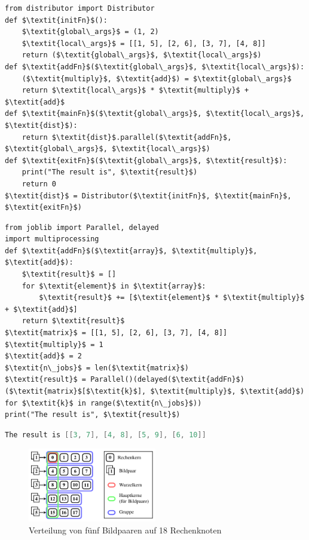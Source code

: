 \begin{lstlisting}[caption={Parallelisierung mittels der in \gls{MPI} implementierten Version},label={lst:dist_api}]
from distributor import Distributor
def $\textit{initFn}$():
	$\textit{global\_args}$ = (1, 2)
	$\textit{local\_args}$ = [[1, 5], [2, 6], [3, 7], [4, 8]]
	return ($\textit{global\_args}$, $\textit{local\_args}$)
def $\textit{addFn}$($\textit{global\_args}$, $\textit{local\_args}$):
	($\textit{multiply}$, $\textit{add}$) = $\textit{global\_args}$
	return $\textit{local\_args}$ * $\textit{multiply}$ + $\textit{add}$
def $\textit{mainFn}$($\textit{global\_args}$, $\textit{local\_args}$, $\textit{dist}$):
	return $\textit{dist}$.parallel($\textit{addFn}$, $\textit{global\_args}$, $\textit{local\_args}$)
def $\textit{exitFn}$($\textit{global\_args}$, $\textit{result}$):
	print("The result is", $\textit{result}$)
	return 0
$\textit{dist}$ = Distributor($\textit{initFn}$, $\textit{mainFn}$, $\textit{exitFn}$)
\end{lstlisting}

\begin{lstlisting}[caption={Parallelisierung mittels der joblib-Bibliothek},label={lst:joblib}]
from joblib import Parallel, delayed
import multiprocessing
def $\textit{addFn}$($\textit{array}$, $\textit{multiply}$, $\textit{add}$):
	$\textit{result}$ = []
	for $\textit{element}$ in $\textit{array}$:
		$\textit{result}$ += [$\textit{element}$ * $\textit{multiply}$ + $\textit{add}$]
	return $\textit{result}$
$\textit{matrix}$ = [[1, 5], [2, 6], [3, 7], [4, 8]]
$\textit{multiply}$ = 1
$\textit{add}$ = 2
$\textit{n\_jobs}$ = len($\textit{matrix}$)
$\textit{result}$ = Parallel()(delayed($\textit{addFn}$)($\textit{matrix}$[$\textit{k}$], $\textit{multiply}$, $\textit{add}$) for $\textit{k}$ in range($\textit{n\_jobs}$))
print("The result is", $\textit{result}$)
\end{lstlisting}

\begin{lstlisting}[language=C, caption={Ausgabe der Programme}, label={lst:ausgabe}]
The result is [[3, 7], [4, 8], [5, 9], [6, 10]]
\end{lstlisting}

\begin{center}
	\begin{figure}[htbp]
		\centering
		\includegraphics[width=0.5\textwidth]{pdf/parallel}
		\caption[Verteilung]{Verteilung von fünf Bildpaaren auf 18 Rechenknoten}
		\label{fig:parallel_concept}
	\end{figure}
\end{center}

